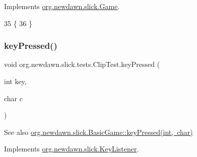 Implements \mbox{\hyperlink{interfaceorg_1_1newdawn_1_1slick_1_1_game_ad2dd6affab08bb8fdb5fab0815957b7a}{org.\+newdawn.\+slick.\+Game}}.


\begin{DoxyCode}
35                                                                     \{
36     \}
\end{DoxyCode}
\mbox{\label{classorg_1_1newdawn_1_1slick_1_1tests_1_1_clip_test_a78a29b4d072cbd0569cfa10c4c46fea6}} 
\subsubsection{\texorpdfstring{key\+Pressed()}{keyPressed()}}
{\footnotesize\ttfamily void org.\+newdawn.\+slick.\+tests.\+Clip\+Test.\+key\+Pressed (\begin{DoxyParamCaption}\item[{int}]{key,  }\item[{char}]{c }\end{DoxyParamCaption})\hspace{0.3cm}{\ttfamily [inline]}}

\begin{DoxySeeAlso}{See also}
\mbox{\hyperlink{classorg_1_1newdawn_1_1slick_1_1_basic_game_a4fbb3345b5abf5ddd54a99466d07f02f}{org.\+newdawn.\+slick.\+Basic\+Game\+::key\+Pressed(int, char)}} 
\end{DoxySeeAlso}


Implements \mbox{\hyperlink{interfaceorg_1_1newdawn_1_1slick_1_1_key_listener_ac0b0568a21ef486c4f51382614c196ef}{org.\+newdawn.\+slick.\+Key\+Listener}}.


